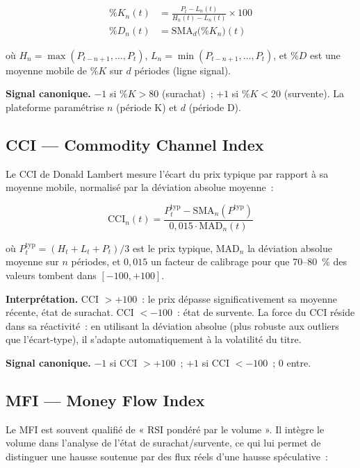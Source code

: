 \begin{align}
    \%K_n(t) &= \frac{P_t - L_n(t)}{H_n(t) - L_n(t)} \times 100 \label{eq:stoch_k} \\[4pt]
    \%D_n(t) &= \text{SMA}_d\!\bigl(\%K_n\bigr)(t) \label{eq:stoch_d}
\end{align}

où $H_n = \max(P_{t-n+1}, \ldots, P_t)$, $L_n = \min(P_{t-n+1}, \ldots, P_t)$,
et $\%D$ est une moyenne mobile de $\%K$ sur $d$ périodes (ligne signal).

\textbf{Signal canonique.}
$-1$ si $\%K > 80$ (surachat)~; $+1$ si $\%K < 20$ (survente). La plateforme
paramétrise $n$ (période K) et $d$ (période D).

\subsection{CCI — Commodity Channel Index}

Le CCI de Donald Lambert mesure l'écart du prix typique par rapport à sa moyenne
mobile, normalisé par la déviation absolue moyenne~:

\begin{equation}
    \text{CCI}_n(t) = \frac{P^{\text{typ}}_t - \text{SMA}_n(P^{\text{typ}})}{0{,}015 \cdot \text{MAD}_n(t)}
    \label{eq:cci}
\end{equation}

où $P^{\text{typ}}_t = (H_t + L_t + P_t) / 3$ est le prix typique,
$\text{MAD}_n$ la déviation absolue moyenne sur $n$ périodes, et $0{,}015$ un facteur
de calibrage pour que 70--80~\% des valeurs tombent dans $[-100, +100]$.

\textbf{Interprétation.}
CCI $> +100$~: le prix dépasse significativement sa moyenne récente, état de surachat.
CCI $< -100$~: état de survente. La force du CCI réside dans sa réactivité~: en
utilisant la déviation absolue (plus robuste aux outliers que l'écart-type), il
s'adapte automatiquement à la volatilité du titre.

\textbf{Signal canonique.} $-1$ si CCI $> +100$~; $+1$ si CCI $< -100$~; $0$ entre.

\subsection{MFI — Money Flow Index}

Le MFI est souvent qualifié de « RSI pondéré par le volume ». Il intègre le volume
dans l'analyse de l'état de surachat/survente, ce qui lui permet de distinguer une
hausse soutenue par des flux réels d'une hausse spéculative~:

